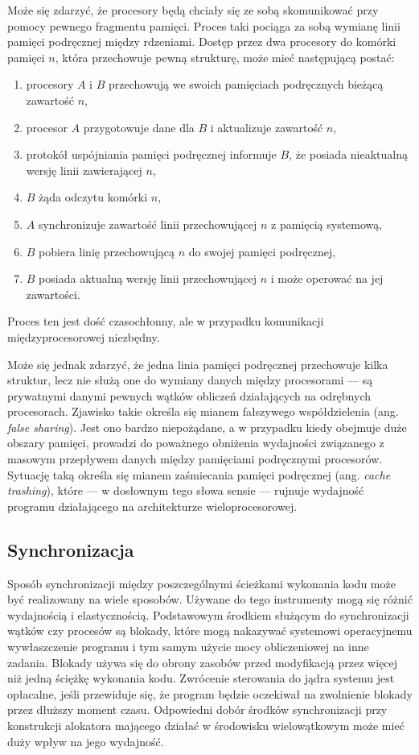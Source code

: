 \documentclass[12pt,a4paper,titlepage,twoside]{mwart}
\begin{document}
Może się zdarzyć, że procesory będą chciały się ze sobą skomunikować przy
pomocy pewnego fragmentu pamięci. Proces taki pociąga za sobą wymianę linii
pamięci podręcznej między rdzeniami. Dostęp przez dwa procesory do komórki
pamięci $n$, która przechowuje pewną strukturę, może mieć następującą postać:

\begin{enumerate}
\item procesory $A$ i $B$ przechowują we swoich pamięciach podręcznych
bieżącą zawartość $n$,
\item procesor $A$ przygotowuje dane dla $B$ i aktualizuje zawartość $n$,
\item protokół uspójniania pamięci podręcznej informuje $B$, że posiada
nieaktualną wersję linii zawierającej $n$,
\item $B$ żąda odczytu komórki $n$,
\item $A$ synchronizuje zawartość linii przechowującej $n$ z pamięcią
systemową,
\item $B$ pobiera linię przechowującą $n$ do swojej pamięci podręcznej,
\item $B$ posiada aktualną wersję linii przechowującej $n$ i może operować na
jej zawartości.
\end{enumerate}

Proces ten jest dość czasochłonny, ale w przypadku komunikacji
międzyprocesorowej niezbędny.

Może się jednak zdarzyć, że jedna linia pamięci podręcznej przechowuje kilka
struktur, lecz nie służą one do wymiany danych między procesorami --- są
prywatnymi danymi pewnych wątków obliczeń działających na odrębnych
procesorach.  Zjawisko takie określa się mianem fałszywego współdzielenia (ang.
\textit{false sharing}). Jest ono bardzo niepożądane, a w przypadku kiedy
obejmuje duże obszary pamięci, prowadzi do poważnego obniżenia wydajności
związanego z masowym przepływem danych między pamięciami podręcznymi
procesorów. Sytuację taką określa się mianem zaśmiecania pamięci podręcznej
(ang. \textit{cache trashing}), które --- w dosłownym tego słowa sensie ---
rujnuje wydajność programu działającego na architekturze wieloprocesorowej.

\subsection{Synchronizacja}

Sposób synchronizacji między poszczególnymi ścieżkami wykonania kodu może być
realizowany na wiele sposobów. Używane do tego instrumenty mogą się różnić
wydajnością i elastycznością. Podstawowym środkiem służącym do synchronizacji
wątków czy procesów są blokady, które mogą nakazywać systemowi operacyjnemu
wywłaszczenie programu i tym samym użycie mocy obliczeniowej na inne zadania.
Blokady używa się do obrony zasobów przed modyfikacją przez więcej niż jedną
ściężkę wykonania kodu. Zwrócenie sterowania do jądra systemu jest opłacalne,
jeśli przewiduje się, że program będzie oczekiwał na zwolnienie blokady przez
dłuższy moment czasu. Odpowiedni dobór środków synchronizacji przy konstrukcji
alokatora mającego działać w środowisku wielowątkowym może mieć duży wpływ na
jego wydajność.
\end{document}
